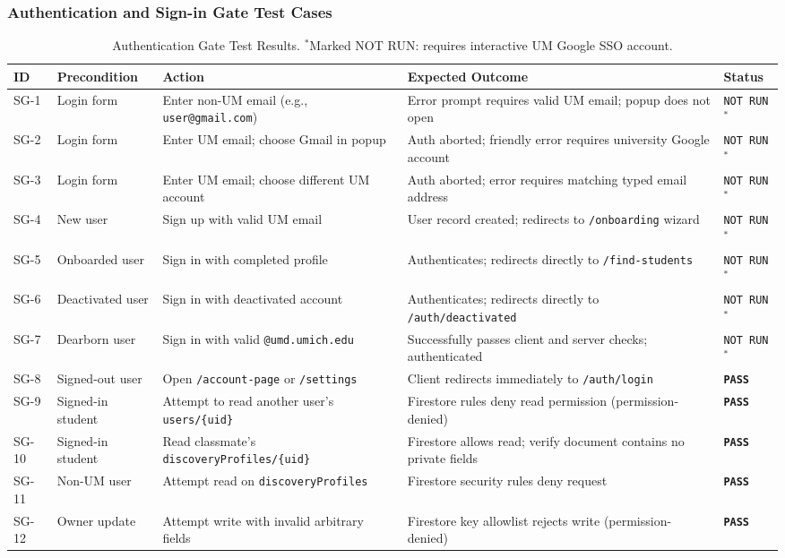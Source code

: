 \documentclass[11pt,letterpaper]{article}
\begin{document}
\subsubsection*{Authentication and Sign-in Gate Test Cases}

\begin{table}[h!]
\centering
\small
\begin{tabularx}{\textwidth}{p{1.0cm} p{2.2cm} Y Y p{1.8cm}}
\toprule
\textbf{ID} & \textbf{Precondition} & \textbf{Action} & \textbf{Expected Outcome} & \textbf{Status} \\
\midrule
SG-1 & Login form & Enter non-UM email (e.g., \texttt{user@gmail.com}) & Error prompt requires valid UM email; popup does not open & \texttt{NOT RUN}$^*$ \\
SG-2 & Login form & Enter UM email; choose Gmail in popup & Auth aborted; friendly error requires university Google account & \texttt{NOT RUN}$^*$ \\
SG-3 & Login form & Enter UM email; choose different UM account & Auth aborted; error requires matching typed email address & \texttt{NOT RUN}$^*$ \\
SG-4 & New user & Sign up with valid UM email & User record created; redirects to \texttt{/onboarding} wizard & \texttt{NOT RUN}$^*$ \\
SG-5 & Onboarded user & Sign in with completed profile & Authenticates; redirects directly to \texttt{/find-students} & \texttt{NOT RUN}$^*$ \\
SG-6 & Deactivated user & Sign in with deactivated account & Authenticates; redirects directly to \texttt{/auth/deactivated} & \texttt{NOT RUN}$^*$ \\
SG-7 & Dearborn user & Sign in with valid \texttt{@umd.umich.edu} & Successfully passes client and server checks; authenticated & \texttt{NOT RUN}$^*$ \\
SG-8 & Signed-out user & Open \texttt{/account-page} or \texttt{/settings} & Client redirects immediately to \texttt{/auth/login} & \textbf{\texttt{PASS}} \\
SG-9 & Signed-in student & Attempt to read another user's \texttt{users/\{uid\}} & Firestore rules deny read permission (permission-denied) & \textbf{\texttt{PASS}} \\
SG-10 & Signed-in student & Read classmate's \texttt{discoveryProfiles/}\allowbreak\texttt{\{uid\}} & Firestore allows read; verify document contains no private fields & \textbf{\texttt{PASS}} \\
SG-11 & Non-UM user & Attempt read on \texttt{discoveryProfiles} & Firestore security rules deny request & \textbf{\texttt{PASS}} \\
SG-12 & Owner update & Attempt write with invalid arbitrary fields & Firestore key allowlist rejects write (permission-denied) & \textbf{\texttt{PASS}} \\
\bottomrule
\end{tabularx}
\caption{Authentication Gate Test Results. \footnotesize{$^*$Marked NOT RUN: requires interactive UM Google SSO account.}}
\end{table}
\end{document}
